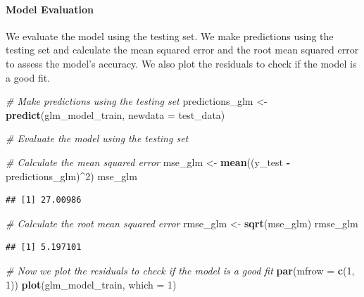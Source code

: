 \documentclass[
]{article}
\newenvironment{Shaded}{\begin{snugshade}}{\end{snugshade}}
\newcommand{\AttributeTok}[1]{\textcolor[rgb]{0.13,0.29,0.53}{#1}}
\newcommand{\CommentTok}[1]{\textcolor[rgb]{0.56,0.35,0.01}{\textit{#1}}}
\newcommand{\DecValTok}[1]{\textcolor[rgb]{0.00,0.00,0.81}{#1}}
\newcommand{\FunctionTok}[1]{\textcolor[rgb]{0.13,0.29,0.53}{\textbf{#1}}}
\newcommand{\NormalTok}[1]{#1}
\newcommand{\OtherTok}[1]{\textcolor[rgb]{0.56,0.35,0.01}{#1}}
\newcommand{\SpecialCharTok}[1]{\textcolor[rgb]{0.81,0.36,0.00}{\textbf{#1}}}
\begin{document}
\paragraph{Model Evaluation}\label{model-evaluation-1}

We evaluate the model using the testing set. We make predictions using
the testing set and calculate the mean squared error and the root mean
squared error to assess the model's accuracy. We also plot the residuals
to check if the model is a good fit.

\begin{Shaded}
\begin{Highlighting}[]
\CommentTok{\# Make predictions using the testing set}
\NormalTok{predictions\_glm }\OtherTok{\textless{}{-}} \FunctionTok{predict}\NormalTok{(glm\_model\_train, }\AttributeTok{newdata =}\NormalTok{ test\_data)}

\CommentTok{\# Evaluate the model using the testing set}

\CommentTok{\# Calculate the mean squared error}
\NormalTok{mse\_glm }\OtherTok{\textless{}{-}} \FunctionTok{mean}\NormalTok{((y\_test }\SpecialCharTok{{-}}\NormalTok{ predictions\_glm)}\SpecialCharTok{\^{}}\DecValTok{2}\NormalTok{)}
\NormalTok{mse\_glm}
\end{Highlighting}
\end{Shaded}

\begin{verbatim}
## [1] 27.00986
\end{verbatim}

\begin{Shaded}
\begin{Highlighting}[]
\CommentTok{\# Calculate the root mean squared error}
\NormalTok{rmse\_glm }\OtherTok{\textless{}{-}} \FunctionTok{sqrt}\NormalTok{(mse\_glm)}
\NormalTok{rmse\_glm}
\end{Highlighting}
\end{Shaded}

\begin{verbatim}
## [1] 5.197101
\end{verbatim}

\begin{Shaded}
\begin{Highlighting}[]
\CommentTok{\# Now we plot the residuals to check if the model is a good fit}
\FunctionTok{par}\NormalTok{(}\AttributeTok{mfrow =} \FunctionTok{c}\NormalTok{(}\DecValTok{1}\NormalTok{, }\DecValTok{1}\NormalTok{))}
\FunctionTok{plot}\NormalTok{(glm\_model\_train, }\AttributeTok{which =} \DecValTok{1}\NormalTok{)}
\end{Highlighting}
\end{Shaded}
\end{document}
